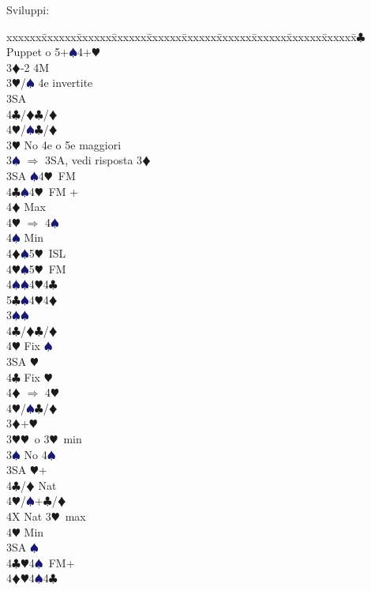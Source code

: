 \documentclass[a4paper,italian]{article}
\newcommand{\BC}{\textcolor{OliveGreen}{$\clubsuit$}}
\newcommand{\BD}{\textcolor{RedOrange}{$\vardiamondsuit$}}
\newcommand{\BH}{\textcolor{Red2}{$\varheartsuit${}}}
\newcommand{\BS}{\textcolor{MidnightBlue}{$\spadesuit${}}}
\newenvironment{bidtable}
{\begin{tabbing}

    xxxxxx\=xxxxxx\=xxxxxx\=xxxxxx\=xxxxxx\=xxxxxx\=xxxxxx\=xxxxxx\=xxxxxx\=xxxxxx\=\kill}
{\end{tabbing} }%
\begin{document}
\begin{multicols}{2}
    Sviluppi:

    \begin{bidtable}
        3\BC \> Puppet o 5+\BS 4+\BH \+\\
        3\BD {}-2 4M\+\\
        3\BH/\BS \> 4e invertite\+\\
        3SA\+\\
        4\BC/\BD {}\BC /\BD \\
        4\BH/\BS {}\BC /\BD \-\-\-\\
        3\BH \> No 4e o 5e maggiori\+\\
        3\BS \> $\Rightarrow$ 3SA, vedi risposta 3\BD\\
        3SA \BS 4\BH\ FM\\
        4\BC {}\BS 4\BH\ FM +\+\\
        4\BD \> Max\+\\
        4\BH \> $\Rightarrow$ 4\BS \-\\
        4\BS \> Min\-\\
        4\BD {}\BS 5\BH\ ISL\\
        4\BH {}\BS 5\BH\ FM\\
        4\BS {}\BS 4\BH 4\BC \\
        5\BC {}\BS 4\BH 4\BD \-\\
        3\BS {}\BS \+\\
        4\BC/\BD {}\BC /\BD \\
        4\BH \> Fix \BS \-\\
        3SA \BH \+\\
        4\BC \> Fix \BH \\
        4\BD \> $\Rightarrow$ 4\BH \\
        4\BH/\BS {}\BC /\BD \-\-\\
        3\BD {}+\BH \+\\
        3\BH {}\BH\ o 3\BH\ min\+\\
        3\BS \> No 4\BS \+\\
        3SA \BH +\+\\
        4\BC/\BD \> Nat\\
        4\BH/\BS {}+\BC /\BD \-\\
        4X \> Nat 3\BH\ max\\
        4\BH \> Min\-\\
        3SA \BS \\
        4\BC {}\BH 4\BS\ FM+\\
        4\BD {}\BH 4\BS 4\BC \\

\end{bidtable}
\end{multicols}
\end{document}
